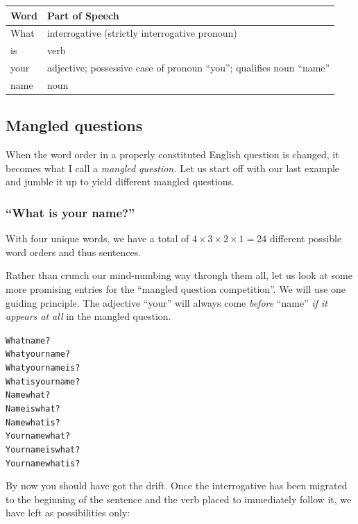 \documentclass[
  a4paper,
]{article}
\newcommand\noun[1]{\textcolor{noun}{#1}}
\newcommand\pronoun[1]{\textcolor{pronoun}{#1}}
\newcommand\action[1]{\textcolor{action}{#1}}
\begin{document}
\begin{longtable}[]{@{}ll@{}}
\toprule
Word & Part of Speech \\
\midrule
\endhead
What & interrogative (strictly interrogative pronoun) \\
is & verb \\
your & adjective; possessive case of pronoun ``you''; qualifies noun
``name'' \\
name & noun \\
\bottomrule
\end{longtable}

\hypertarget{mangled-questions}{%
\subsection{Mangled questions}\label{mangled-questions}}

When the word order in a properly constituted English question is
changed, it becomes what I call a \emph{mangled question.} Let us start
off with our last example and jumble it up to yield different mangled
questions.

\hypertarget{what-is-your-name-1}{%
\subsubsection{``What is your name?''}\label{what-is-your-name-1}}

With four unique words, we have a total of
\(4 \times 3 \times 2 \times 1 = 24\) different possible word orders and
thus sentences.

Rather than crunch our mind-numbing way through them all, let us look at
some more promising entries for the ``mangled question competition''. We
will use one guiding principle. The adjective ``your'' will always come
\emph{before} ``name'' \emph{if it appears at all} in the mangled
question.

\begin{tcolorbox}
\begin{alltt}
\color{normal}
What \noun{name}?
What \pronoun{your} \noun{name}?
What \pronoun{your} \noun{name} \action{is}?
What \action{is} \pronoun{your} \noun{name}?
\noun{Name} what?
\noun{Name} \action{is} what?
\noun{Name} what \action{is}?
\pronoun{Your} \noun{name} what?
\pronoun{Your} \noun{name} \action{is} what?
\pronoun{Your} \noun{name} what \action{is}?
\end{alltt}
\end{tcolorbox}

By now you should have got the drift. Once the interrogative has been
migrated to the beginning of the sentence and the verb placed to
immediately follow it, we have left as possibilities only:
\end{document}
